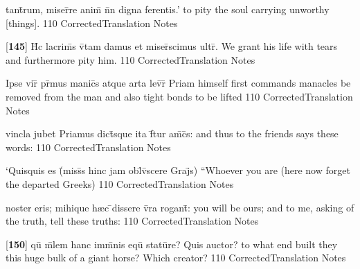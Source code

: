 \latline
  {tant\={}rum, miser\={}re anim\={\macron {\i}} n\={}n digna ferentis.'}
  { to pity the soul carrying unworthy [things]. }
  {110}
  { CorrectedTranslation }
  { Notes }


\latline
  {[\textbf{145}] H\={\macron {\i}}c lacrim\={\macron {\i}}s v\={\macron {\i}}tam damus et miser\={}scimus ultr\={}.}
  { We grant his life with tears and furthermore pity him. }
  {110}
  { CorrectedTranslation }
  { Notes }


\latline
  {Ipse vir\={} pr\={\macron {\i}}mus manic\={}s atque arta lev\={}r\={\macron {\i}}}
  { Priam himself first commands manacles be removed from the man and also tight bonds to be lifted }
  {110}
  { CorrectedTranslation }
  { Notes }


\latline
  {vincla jubet Priamus dict\={\macron {\i}}sque ita f\={}tur am\={\macron {\i}}c\={\macron {\i}}s:}
  { and thus to the friends says these words: }
  {110}
  { CorrectedTranslation }
  { Notes }


\latline
  {`Quisquis es (\={}miss\={}s hinc jam obl\={\macron {\i}}v\={\macron {\i}}scere Graj\={}s)}
  { ``Whoever you are (here now forget the departed Greeks)}
  {110}
  { CorrectedTranslation }
  { Notes }


\latline
  {noster eris; mihique h{\ae}c \={}dissere v\={}ra rogant\={\macron {\i}}:}
  { you will be ours; and to me, asking of the truth, tell these truths:  }
  {110}
  { CorrectedTranslation }
  { Notes }


\latline
  {[\textbf{150}] qu\={} m\={}lem hanc imm\={}nis equ\={\macron {\i}} statu\={}re?  Quis auctor?}
  { to what end built they this huge bulk of a giant horse?  Which creator? }
  {110}
  { CorrectedTranslation }
  { Notes }



